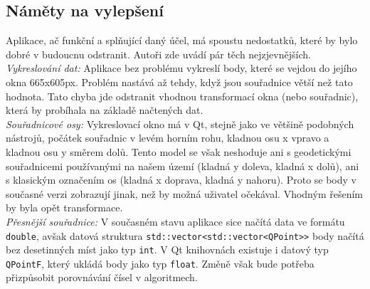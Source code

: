 \documentclass{article}
\begin{document}
	\subsection{Náměty na vylepšení} %
	\indent Aplikace, ač funkční a splňující daný účel, má spoustu nedostatků, které by bylo dobré v budoucnu odstranit. Autoři zde uvádí pár těch nejzjevnějších. \\
	\indent \textit{Vykreslování dat:} Aplikace bez problému vykreslí body, které se vejdou do jejího okna 665x605px. Problém nastává až tehdy, když jsou souřadnice větší než tato hodnota. Tato chyba jde odstranit vhodnou transformací okna (nebo souřadnic), která by probíhala na základě načtených dat. \\
	\indent \textit{Souřadnicové osy: } Vykreslovací okno má v Qt, stejně jako ve většině podobných nástrojů, počátek souřadnic v levém horním rohu, kladnou osu x vpravo a kladnou osu y směrem dolů. Tento model se však neshoduje ani s geodetickými souřadnicemi používanými na našem území (kladná y doleva, kladná x dolů), ani s klasickým označením os (kladná x doprava, kladná y nahoru). Proto se body v současné verzi zobrazují jinak, než by možná uživatel očekával. Vhodným řešením by byla opět transformace. \\
	\indent \textit{Přesnější souřadnice:} V současném stavu aplikace sice načítá data ve formátu \texttt{double}, avšak datová struktura \texttt{std::vector<std::vector<QPoint>>} body načítá bez desetinných míst jako typ \texttt{int}. V Qt knihovnách existuje i datový typ \texttt{QPointF}, který ukládá body jako typ \texttt{float}. Změně však bude potřeba přizpůsobit porovnávání čísel v algoritmech.


\pagestyle{empty}

\clearpage

\end{document}
